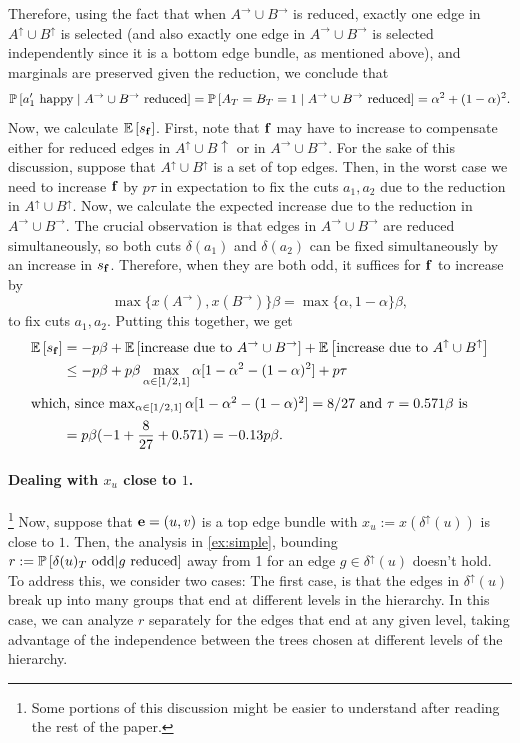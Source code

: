 \begin{example}
Therefore, using the fact that when $A^\rightarrow \cup B^\rightarrow$ is reduced, exactly one edge in $A^\uparrow \cup B^\uparrow$ is selected (and also exactly one edge in $A^\rightarrow \cup B^\rightarrow$ is selected independently since it is a bottom edge bundle, as mentioned above),  and marginals are preserved given the reduction,
 we conclude that
$$\P{a_1'\text{ happy} \mid A^\rightarrow \cup B^\rightarrow\text{ reduced}}  =\P{A_T= B_T = 1 \mid A^\rightarrow \cup B^\rightarrow\text{ reduced}}  =\alpha^2 + (1-\alpha)^2. $$
Now, we calculate $\E{s_\bbf}$. First, note that $\bbf$ may have to increase to compensate either for reduced edges in $A^\uparrow\cup B\uparrow$ or in $A^\rightarrow\cup B
^\rightarrow$.
For the sake of this discussion, suppose that $A^\uparrow \cup B^\uparrow$ is a set of top edges. Then, in the worst case we need to increase $\bbf$ by $p\tau$ in expectation to fix the cuts $a_1,a_2$ due to the reduction in $A^\uparrow \cup B^\uparrow$.
Now, we calculate the expected increase due to the reduction in $A^\rightarrow\cup B^\rightarrow$.
The crucial observation is that edges in $A^\rightarrow \cup B^\rightarrow$ are reduced simultaneously, so both cuts $\delta(a_1)$ and $\delta(a_2)$ can be fixed simultaneously by an increase in $s_\bbf$. Therefore, when they are both odd,  it suffices for $\bbf$ to increase by 
$$\max\{x(A^\rightarrow), x(B^\rightarrow)\}\beta = \max \{\alpha, 1-\alpha\}\beta,$$ 
to fix cuts $a_1,a_2$. Putting this together, we get
\begin{align*}
	\E {s_\bbf} & = -p\beta + \E{\text{increase due to }A^\rightarrow \cup B^\rightarrow} + \E{\text{increase due to }A^\uparrow \cup B^\uparrow}\\
	&\le -p\beta  +p\beta \max_{\alpha \in [1/2, 1] }\alpha[1-\alpha^2 - (1-\alpha)^2] + p\tau\\
	\intertext{which, since  $\max_{\alpha \in [1/2, 1] }\alpha[1-\alpha^2 - (1-\alpha)^2]= 8/27$ and  $\tau = 0.571 \beta$ is}
	&= p\beta (-1 + \frac{8}{27} + 0.571) = -0.13 p \beta.
\end{align*}
\end{example}

\paragraph{Dealing with $x_u$ close to $1$.}\footnote{Some portions of this discussion might be easier to understand after reading the rest of the paper.} 
\hypertarget{ABC-explanation}{Now}, suppose that $\bbe=(u,v)$ is a top edge bundle with $x_u:=x(\delta^\uparrow(u))$ is close to  $1$.
 Then, the  analysis in \cref{ex:simple}, bounding $r:= \P{\delta(u)_T \text{ odd} | g\text{ reduced}}$ away from 1 for an edge $g\in \delta^\uparrow(u)$ doesn't hold.
To address this, we consider two cases:
The first case, is that the edges in $\delta^\uparrow(u)$ break up into many groups that end at different levels in the hierarchy.
In this case, we can analyze $r$ separately for the edges that end at any given level, taking advantage of the independence between the trees chosen at different levels of the hierarchy.

